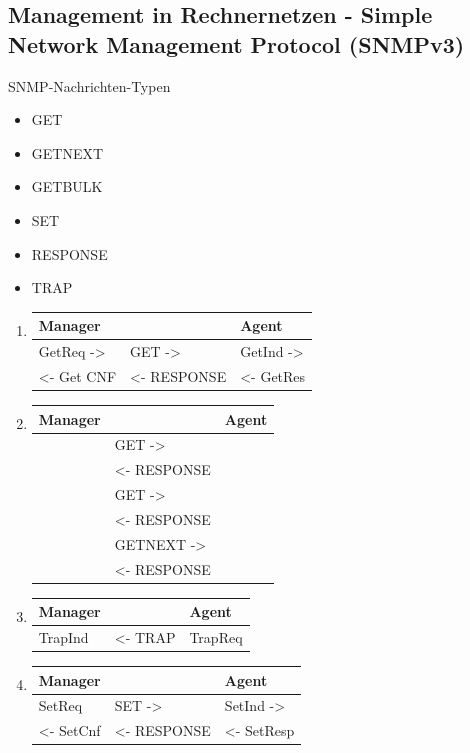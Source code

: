 \subsection{Management in Rechnernetzen - Simple Network Management Protocol (SNMPv3)}
SNMP-Nachrichten-Typen
\begin{itemize}
	\item GET
	\item GETNEXT
	\item GETBULK
	\item SET
	\item RESPONSE
	\item TRAP
\end{itemize}
\begin{enumerate}
\item
\begin{tabularx}{\textwidth}{|X|X|X|}
\hline
Manager &&Agent\\
\hline
GetReq -> &GET ->&GetInd ->\\
<- Get CNF &<- RESPONSE&<- GetRes\\
\hline
\end{tabularx}
\item
\begin{tabularx}{\textwidth}{|X|X|X|}
\hline
Manager &&Agent\\
\hline
&GET ->&\\
&<- RESPONSE&\\
&GET ->&\\
&<- RESPONSE&\\
&GETNEXT ->&\\
&<- RESPONSE&\\
\hline
\end{tabularx}
\item 
\begin{tabularx}{\textwidth}{|X|X|X|}
\hline
Manager &&Agent\\
\hline
TrapInd&<- TRAP &TrapReq\\
\hline
\end{tabularx}
\item 
\begin{tabularx}{\textwidth}{|X|X|X|}
\hline
Manager &&Agent\\
\hline
SetReq &SET ->& SetInd ->\\
<- SetCnf &<- RESPONSE&<- SetResp\\
\hline
\end{tabularx}
\end{enumerate}
